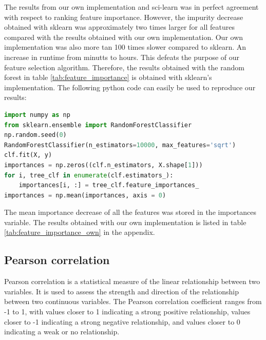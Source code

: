 The results from our own implementation and sci-learn was in perfect agreement
with respect to ranking feature importance. 
However, the impurity decrease obtained with sklearn was
approximately two times larger for all features compared with the results obtained with our own
implementation. Our own implementation was also more tan 100 times slower
compared to
sklearn. An increase in runtime from minutts to hours. This defeats the purpose
of our feature selection algorithm. 
Therefore, the results obtained with the random forest in table
\ref{tab:feature_importance}  is obtained with sklearn's implementation. 
The following python code can easily
be used to reproduce our results:  
\begin{lstlisting}[language=Python]
import numpy as np 
from sklearn.ensemble import RandomForestClassifier
np.random.seed(0)
RandomForestClassifier(n_estimators=10000, max_features='sqrt')
clf.fit(X, y)
importances = np.zeros((clf.n_estimators, X.shape[1]))
for i, tree_clf in enumerate(clf.estimators_): 
    importances[i, :] = tree_clf.feature_importances_
importances = np.mean(importances, axis = 0)
\end{lstlisting}
The mean importance decrease of all the features was stored in the importances
variable. The results obtained with our own implementation is listed in table
\ref{tab:feature_importance_own} in the appendix. 



























\subsection{Pearson correlation}
Pearson correlation is a statistical measure of the linear relationship between
two variables. It is used to assess the strength and direction of the
relationship between two continuous variables.
The Pearson correlation coefficient ranges from -1 to 1, with values closer to
1 indicating a strong positive relationship, values closer to -1 indicating a
strong negative relationship, and values closer to 0 indicating a weak or no
relationship.

